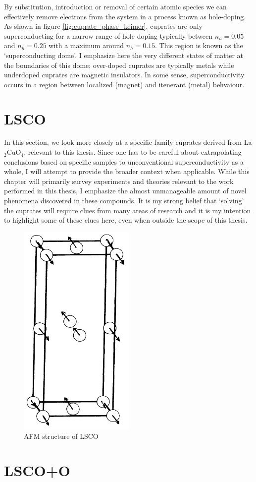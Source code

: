 By substitution, introduction or removal of certain atomic species we can effectively remove electrons from the system in a process known as hole-doping. As shown in figure \ref{fig:cuprate_phase_keimer}, cuprates are only superconducting for a narrow range of hole doping typically between $n_h = 0.05$ and $n_h = 0.25$ with a maximum around $n_h = 0.15$. This region is known as the `superconducting dome'. I emphasize here the very different states of matter at the boundaries of this dome; over-doped cuprates are typically metals while underdoped cuprates are magnetic insulators. In some sense, superconductivity occurs in a region between localized (magnet) and itenerant (metal) behvaiour.


\section{LSCO}

In this section, we look more closely at a specific family cuprates derived from La$_2$CuO$_4$, relevant to this thesis. Since one has to be careful about extrapolating conclusions based on specific samples to unconventional superconductivity as a whole, I will attempt to provide the broader context when applicable. While this chapter will primarily survey experiments and theories relevant to the work performed in this thesis, I emphasize the almost unmanageable amount of novel phenomena discovered in these compounds. It is my strong belief that `solving' the cuprates will require clues from many areas of research and it is my intention to highlight some of these clues here, even when outside the scope of this thesis.

\begin{figure}
    \centering
    \includegraphics[width=0.5\textwidth]{fig/lsco/lsco_afm.png}
    \caption[AFM structure of LSCO]{AFM structure of LSCO}
    \label{fig:lsco_afm}
\end{figure}

\section{LSCO+O}